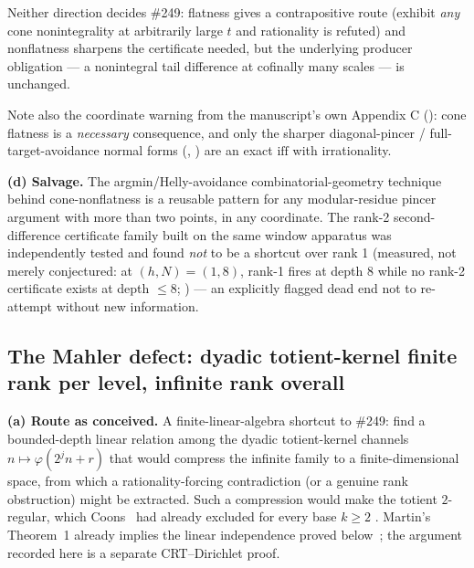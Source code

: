 Neither direction decides \#249: flatness
gives a contrapositive route (exhibit \emph{any} cone nonintegrality at
arbitrarily large \(t\) and rationality is refuted) and nonflatness sharpens
the certificate needed, but the underlying producer obligation — a
nonintegral tail difference at cofinally many scales — is unchanged.

Note
also the coordinate warning from the manuscript's own Appendix C
(): cone flatness is a
\emph{necessary} consequence, and only the sharper diagonal-pincer /
full-target-avoidance normal forms
(,
) are an exact
\(\mathrm{iff}\) with irrationality.

\textbf{(d) Salvage.} The argmin/Helly-avoidance combinatorial-geometry
technique behind cone-nonflatness is a reusable pattern for any modular-residue
pincer argument with more than two points, in any coordinate. The rank-2
second-difference certificate family built on the same window apparatus was
independently tested and found \emph{not} to be a shortcut over rank 1
(measured, not merely conjectured: at \((h,N)=(1,8)\), rank-1 fires at depth
8 while no rank-2 certificate exists at depth \(\le8\);
) — an
explicitly flagged dead end not to re-attempt without new information.

\subsection{The Mahler defect: dyadic totient-kernel finite rank per level,
infinite rank overall}
\label{sec:mahler-defect}

\textbf{(a) Route as conceived.} A finite-linear-algebra shortcut to \#249:
find a bounded-depth linear relation among the dyadic totient-kernel
channels \(n\mapsto\varphi(2^jn+r)\) that would compress the infinite
family to a finite-dimensional space, from which a rationality-forcing
contradiction (or a genuine rank obstruction) might be extracted.  Such a
compression would make the totient $2$-regular, which
Coons~\cite[Theorem~3.2]{coons} had already
excluded for every base $k\ge2$ .  Martin's Theorem~1 already implies
the linear independence proved below~\cite[Theorem~1]{martin-phi-inequalities};
the argument recorded here is a separate CRT--Dirichlet proof.

